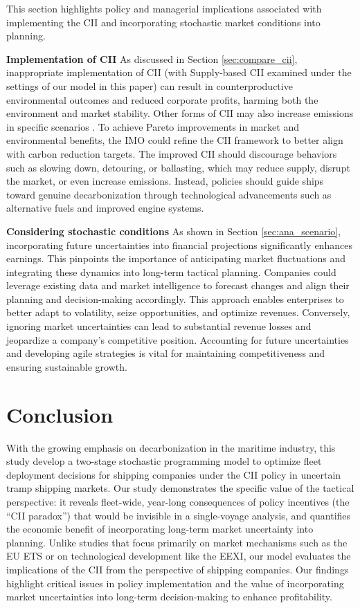 \documentclass[11pt,english]{article}
\begin{document}
This section highlights policy and managerial implications associated with implementing the CII and incorporating stochastic market conditions into planning. 

\textbf{Implementation of CII}  
As discussed in Section \ref{sec:compare_cii}, inappropriate implementation of CII (with Supply-based CII examined under the settings of our model in this paper) can result in counterproductive environmental outcomes and reduced corporate profits, harming both the environment and market stability. Other forms of CII may also increase emissions in specific scenarios \citep{wang2021paradox}. To achieve Pareto improvements in market and environmental benefits, the IMO could refine the CII framework to better align with carbon reduction targets. The improved CII should discourage behaviors such as slowing down, detouring, or ballasting, which may reduce supply, disrupt the market, or even increase emissions. Instead, policies should guide ships toward genuine decarbonization through technological advancements such as alternative fuels and improved engine systems.

\textbf{Considering stochastic conditions}  
As shown in Section \ref{sec:ana_scenario}, incorporating future uncertainties into financial projections significantly enhances earnings. This pinpoints the importance of anticipating market fluctuations and integrating these dynamics into long-term tactical planning. Companies could leverage existing data and market intelligence to forecast changes and align their planning and decision-making accordingly. This approach enables enterprises to better adapt to volatility, seize opportunities, and optimize revenues. Conversely, ignoring market uncertainties can lead to substantial revenue losses and jeopardize a company's competitive position. Accounting for future uncertainties and developing agile strategies is vital for maintaining competitiveness and ensuring sustainable growth.


\section{Conclusion}
\label{sec:conclusion}
  
With the growing emphasis on decarbonization in the maritime industry, this study develop a two-stage stochastic programming model to optimize fleet deployment decisions for shipping companies under the CII policy in uncertain tramp shipping markets. Our study demonstrates the specific value of the tactical perspective: it reveals fleet-wide, year-long consequences of policy incentives (the ``CII paradox'') that would be invisible in a single-voyage analysis, and quantifies the economic benefit of incorporating long-term market uncertainty into planning. Unlike studies that focus primarily on market mechanisms such as the EU ETS or on technological development like the EEXI, our model evaluates the implications of the CII from the perspective of shipping companies. Our findings highlight critical issues in policy implementation and the value of incorporating market uncertainties into long-term decision-making to enhance profitability.
\end{document}
